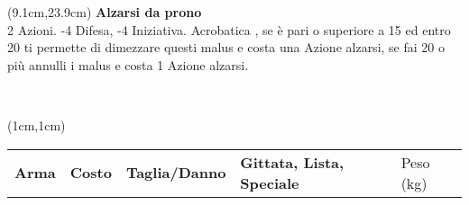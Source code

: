 \documentclass[a4paper,12 pt,openany]{book}
\begin{document}
\begin{textblock*}{6.7cm}(9.1cm,23.9cm) %
\textbf{Alzarsi da prono}\\
2 Azioni. -4 Difesa, -4 Iniziativa. Acrobatica , se è pari o superiore a 15 ed entro 20 ti permette di dimezzare questi malus e costa una Azione alzarsi,
se fai 20 o più annulli i malus e costa 1 Azione alzarsi.
\end{textblock*}



	~\newpage


	\begin{textblock*}{19.5cm}(1cm,1cm) %
		\footnotesize
		\begin{tabular}{lllll}
\textbf{Arma}&\textbf{Costo}&\textbf{Taglia/Danno} & \textbf{Gittata, Lista, Speciale} & Peso (kg)\\


\end{tabular}
\end{textblock*}
\end{document}
